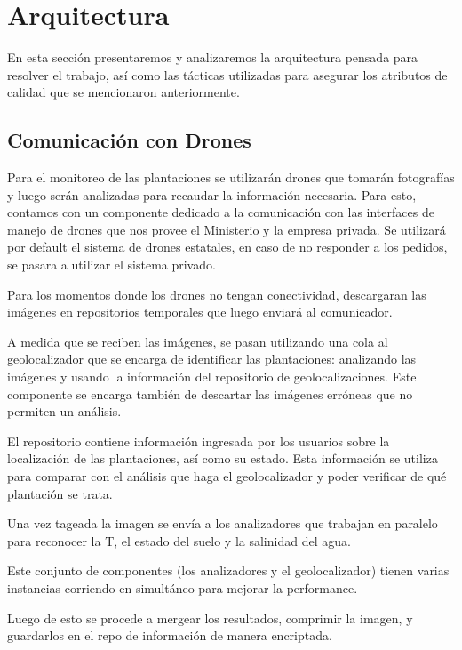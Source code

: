 \section{Arquitectura}

En esta secci\'on presentaremos y analizaremos la arquitectura pensada para resolver el trabajo, as\'i como las t\'acticas utilizadas para asegurar los atributos de calidad que se mencionaron anteriormente.

\subsection{Comunicaci\'on con Drones}

Para el monitoreo de las plantaciones se utilizar\'an drones que tomar\'an fotograf\'ias y luego ser\'an analizadas para recaudar la informaci\'on necesaria.  Para esto, contamos con un componente dedicado a la comunicaci\'on con las interfaces de manejo de drones que nos provee el Ministerio y la empresa privada. Se utilizar\'a por default el sistema de drones estatales, en caso de no responder a los pedidos, se pasara a utilizar el sistema privado.

Para los momentos donde los drones no tengan conectividad, descargaran las im\'agenes en repositorios temporales que luego enviar\'a al comunicador.

A medida que se reciben las im\'agenes, se pasan utilizando una cola al geolocalizador que se encarga de identificar las plantaciones: analizando las im\'agenes y usando la informaci\'on del repositorio de geolocalizaciones. Este componente se encarga tambi\'en de descartar las im\'agenes err\'oneas que no permiten un an\'alisis.

El repositorio contiene informaci\'on ingresada por los usuarios sobre la localizaci\'on de las plantaciones, as\'i como su estado. Esta informaci\'on se utiliza para comparar con el an\'alisis que haga el geolocalizador y poder verificar de qu\'e plantaci\'on se trata.

Una vez tageada la imagen se env\'ia a los analizadores que trabajan en paralelo para reconocer la T\textdegree, el estado del suelo y la salinidad del agua. 

Este conjunto de componentes (los analizadores y el geolocalizador) tienen varias instancias corriendo en simult\'aneo para mejorar la performance.

Luego de esto se procede a mergear los resultados, comprimir la imagen, y guardarlos en el repo de informaci\'on de manera encriptada.

